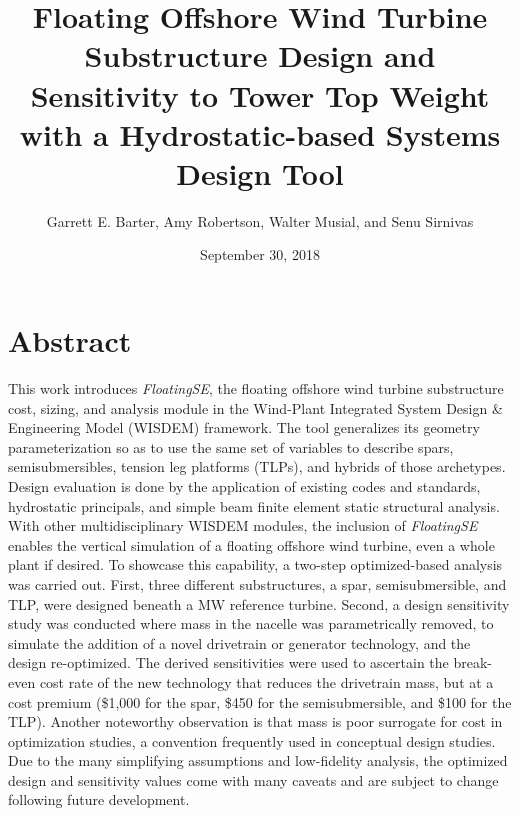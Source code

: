 \documentclass[10pt]{article}
\title{Floating Offshore Wind Turbine Substructure Design and
  Sensitivity to Tower Top Weight with a Hydrostatic-based Systems
  Design Tool}
\author{Garrett E. Barter, Amy Robertson, Walter Musial, and Senu Sirnivas}
\date{September 30, 2018}
\begin{document}
\maketitle
\section*{Abstract}
This work introduces \textit{FloatingSE}, the floating offshore wind
turbine substructure cost, sizing, and analysis module in the Wind-Plant
Integrated System Design \& Engineering Model (WISDEM) framework.  The
tool generalizes its geometry parameterization so as to use the same set
of variables to describe spars, semisubmersibles, tension leg platforms
(TLPs), and hybrids of those archetypes.  Design evaluation is done by
the application of existing codes and standards, hydrostatic principals,
and simple beam finite element static structural analysis.  With other
multidisciplinary WISDEM modules, the inclusion of \textit{FloatingSE}
enables the vertical simulation of a floating offshore wind turbine,
even a whole plant if desired.  To showcase this capability, a two-step
optimized-based analysis was carried out.  First, three different
substructures, a spar, semisubmersible, and TLP, were designed beneath a
\unit[10]{MW} reference turbine. Second, a design sensitivity study was
conducted where mass in the nacelle was parametrically removed, to
simulate the addition of a novel drivetrain or generator technology, and
the design re-optimized.  The derived sensitivities were used to
ascertain the break-even cost rate of the new technology that reduces
the drivetrain mass, but at a cost premium (\$1,000 for the spar, \$450
for the semisubmersible, and \$100 for the TLP).  Another noteworthy
observation is that mass is poor surrogate for cost in optimization
studies, a convention frequently used in conceptual design studies.  Due
to the many simplifying assumptions and low-fidelity analysis, the
optimized design and sensitivity values come with many caveats and are
subject to change following future development.









\begin{singlespace} \begin{small} \pagestyle{plain}
    
    
\end{small} \end{singlespace}
\end{document}
